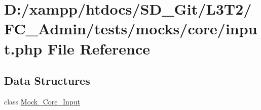 \hypertarget{tests_2mocks_2core_2_input_8php}{}\section{D\+:/xampp/htdocs/\+S\+D\+\_\+\+Git/\+L3\+T2/\+F\+C\+\_\+\+Admin/tests/mocks/core/input.php File Reference}
\label{tests_2mocks_2core_2_input_8php}
\subsection*{Data Structures}
\begin{DoxyCompactItemize}
\item 
class \hyperlink{class_mock___core___input}{Mock\+\_\+\+Core\+\_\+\+Input}
\end{DoxyCompactItemize}
